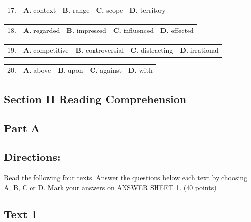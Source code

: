 \documentclass[UTF8,11pt]{ctexart}
\begin{document}
\noindent\begin{tabularx}{\linewidth}{@{}lXXXX@{}}17. & \textbf{A.} context & \textbf{B.} range & \textbf{C.} scope & \textbf{D.} territory\\\end{tabularx}\par

\noindent\begin{tabularx}{\linewidth}{@{}lXXXX@{}}18. & \textbf{A.} regarded & \textbf{B.} impressed & \textbf{C.} influenced & \textbf{D.} effected\\\end{tabularx}\par

\noindent\begin{tabularx}{\linewidth}{@{}lXXXX@{}}19. & \textbf{A.} competitive & \textbf{B.} controversial & \textbf{C.} distracting & \textbf{D.} irrational\\\end{tabularx}\par

\noindent\begin{tabularx}{\linewidth}{@{}lXXXX@{}}20. & \textbf{A.} above & \textbf{B.} upon & \textbf{C.} against & \textbf{D.} with\\\end{tabularx}\par

\subsection*{\textbf{Section II Reading Comprehension}}


\subsection*{\textbf{Part A}}


\subsection*{\textbf{Directions:}}


Read the following four texts. Answer the questions below each text by choosing A, B, C or D. Mark your answers on ANSWER SHEET 1. (40 points)


\subsection*{\textbf{Text 1}}
\end{document}
